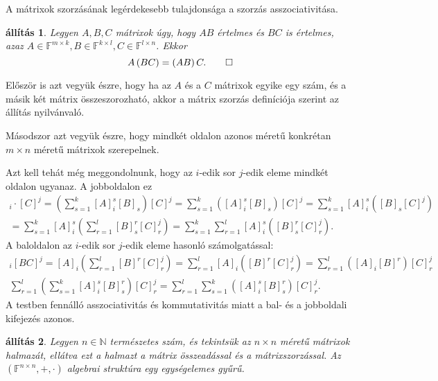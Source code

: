 \documentclass[9pt, showtrims]{memoir}
\makeatletter
\renewenvironment{proof}[1][\proofname]
    {\par\pushQED{\qed}%
    \normalfont \topsep6\p@\@plus6\p@\relax
    \trivlist
    \item[\hskip\labelsep
        \itshape
    #1\@addpunct{:}]\ignorespaces}
    {\popQED\endtrivlist\@endpefalse}
\theoremstyle{plain}
\newtheorem{proposition}{állítás}[section]
\theoremstyle{remark}
\theoremstyle{definition}
\renewcommand{\mathbf}{\mathbb}
\makeatother
\begin{document}
A mátrixok szorzásának legérdekesebb tulajdonsága a szorzás asszociativitása.
\begin{proposition}
    Legyen $A,B,C$ mátrixok úgy, hogy $AB$ értelmes és $BC$ is értelmes, 
    azaz $A\in\mathbf{F}^{m\times k},B\in\mathbf{F}^{k\times l}, C\in\mathbf{F}^{l\times n}$.
    Ekkor
    \[
        A\left( BC \right)=\left( AB \right)C.\qedhere
    \]
\end{proposition}
\begin{proof}
    Először is azt vegyük észre, 
    hogy ha az $A$ és a $C$ mátrixok egyike egy szám, 
    és a másik két mátrix összeszorozható, 
    akkor a mátrix szorzás definíciója szerint az állítás nyilvánvaló.

    Másodszor azt vegyük észre, hogy mindkét oldalon azonos méretű 
    konkrétan $m\times n$ méretű mátrixok szerepelnek.
    
    Azt kell tehát még meggondolnunk,
    hogy az $i$-edik sor $j$-edik eleme mindkét oldalon ugyanaz.
    A jobboldalon ez
    \begin{multline*}
        [AB]_i\cdot [C]^j
        =
        \left( \sum_{s=1}^k[A]_i^s[B]_s \right)[C]^j
        =
        \sum_{s=1}^k\left([A]_i^s[B]_s\right)[C]^j
        =
        \sum_{s=1}^k[A]_i^s\left([B]_s[C]^j\right)
        \\
        =
        \sum_{s=1}^k[A]_i^s\left(\sum_{r=1}^l[B]_s^r[C]_r^j\right)
        =
        \sum_{s=1}^k\sum_{r=1}^l[A]_i^s([B]_s^r[C]_r^j).
    \end{multline*}
    A baloldalon
    az $i$-edik sor $j$-edik eleme hasonló számolgatással:
    \begin{multline*}
        [A]_i[BC]^j=
        [A]_i\left( \sum_{r=1}^l[B]^r[C]_r^j \right)
        =
        \sum_{r=1}^l[A]_i\left([B]^r[C]_r^j\right)
        =
        \sum_{r=1}^l\left([A]_i[B]^r\right)[C]_r^j
        \\
        \sum_{r=1}^l\left(\sum_{s=1}^k[A]_i^s[B]_s^r\right)[C]_r^j
        =
        \sum_{r=1}^l\sum_{s=1}^k\left([A]_i^s[B]_s^r\right)[C]_r^j.
    \end{multline*}
    A testben fennálló asszociativitás és kommutativitás miatt a bal- és a jobboldali kifejezés azonos.
\end{proof}
\begin{proposition}
    Legyen $n\in\mathbf{N}$ természetes szám, és tekintsük az $n\times n$ méretű mátrixok
    halmazát, ellátva ezt a halmazt a mátrix összeadással és a mátrixszorzással.
    Az $\left( \mathbf{F}^{n\times n},+,\cdot \right)$ algebrai struktúra egy egységelemes gyűrű.
\end{proposition}
\end{document}
